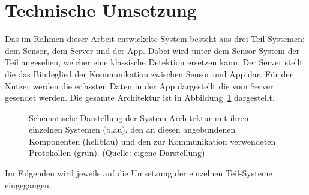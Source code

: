 \section{Technische Umsetzung}\label{ch:Umsetzung}
Das im Rahmen dieser Arbeit entwickelte System besteht aus drei Teil-Systemen: dem Sensor, dem Server und der App.
Dabei wird unter dem Sensor System der Teil angesehen, welcher eine klassische Detektion ersetzen kann.
Der Server stellt die das Bindeglied der Kommunikation zwischen Sensor und App dar.
Für den Nutzer werden die erfassten Daten in der App dargestellt die vom Server gesendet werden.
Die gesamte Architektur ist in Abbildung~\ref{fig:Architektur} dargestellt.

\begin{figure}[h]
    \myImagePos{}
    
    \caption[Schematische Darstellung der System-Architektur]{Schematische Darstellung der System-Architektur mit ihren einzelnen Systemen (blau), den an diesen angebundenen Komponenten (hellblau) und den zur Kommunikation verwendeten Protokollen (grün). (Quelle: eigene Darstellung)}
    \label{fig:Architektur}
\end{figure}

Im Folgenden wird jeweils auf die Umsetzung der einzelnen Teil-Systeme eingegangen.




